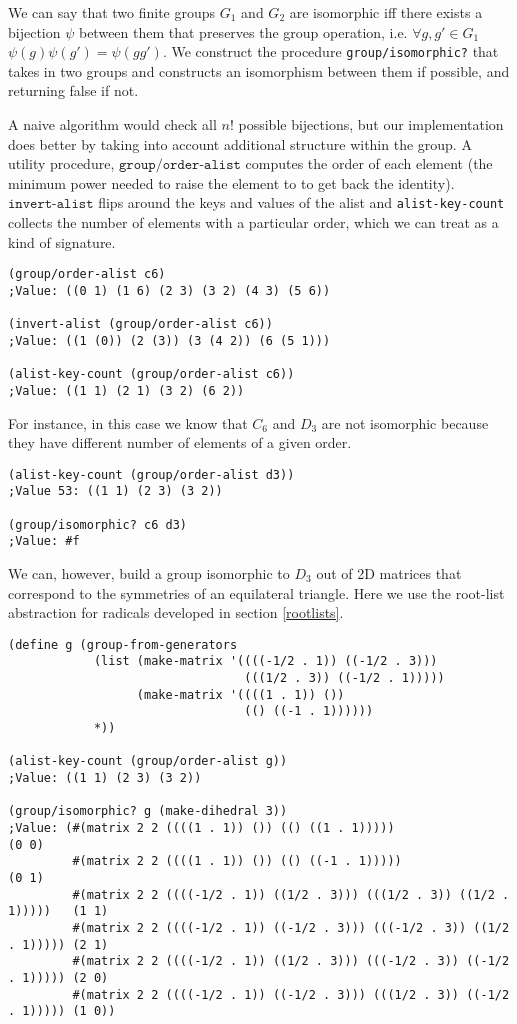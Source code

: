 \documentclass{article}
\begin{document}
            We can say that two finite groups $G_1$ and $G_2$ are isomorphic iff there exists a bijection $\psi$ between them that preserves the group operation, i.e. $\forall g, g' \in G_1$ $\psi(g)\psi(g') = \psi(gg')$. We construct the procedure \texttt{group/isomorphic?} that takes in two groups and constructs an isomorphism between them if possible, and returning false if not.
            
            A naive algorithm would check all $n!$ possible bijections, but our implementation does better by taking into account additional structure within the group. A utility procedure, $\texttt{group/order-alist}$ computes the order of each element (the minimum power needed to raise the element to to get back the identity). $\texttt{invert-alist}$ flips around the keys and values of the alist and \texttt{alist-key-count} collects the number of elements with a particular order, which we can treat as a kind of signature.
		
\begin{verbatim}
(group/order-alist c6)
;Value: ((0 1) (1 6) (2 3) (3 2) (4 3) (5 6))

(invert-alist (group/order-alist c6))
;Value: ((1 (0)) (2 (3)) (3 (4 2)) (6 (5 1)))

(alist-key-count (group/order-alist c6))
;Value: ((1 1) (2 1) (3 2) (6 2))
\end{verbatim}
		
            For instance, in this case we know that $C_{6}$ and $D_3$ are not isomorphic because they have different number of elements of a given order.

\begin{verbatim}
(alist-key-count (group/order-alist d3))
;Value 53: ((1 1) (2 3) (3 2))

(group/isomorphic? c6 d3)
;Value: #f
\end{verbatim}

            We can, however, build a group isomorphic to $D_3$ out of 2D matrices that correspond to the symmetries of an equilateral triangle. Here we use the root-list abstraction for radicals developed in section \ref{rootlists}.
		
\begin{verbatim}
(define g (group-from-generators
     	    (list (make-matrix '((((-1/2 . 1)) ((-1/2 . 3)))
				                 (((1/2 . 3)) ((-1/2 . 1)))))
		          (make-matrix '((((1 . 1)) ())
				                 (() ((-1 . 1))))))
	        *))

(alist-key-count (group/order-alist g))
;Value: ((1 1) (2 3) (3 2))

(group/isomorphic? g (make-dihedral 3))
;Value: (#(matrix 2 2 ((((1 . 1)) ()) (() ((1 . 1)))))                          (0 0) 
         #(matrix 2 2 ((((1 . 1)) ()) (() ((-1 . 1)))))                         (0 1) 
         #(matrix 2 2 ((((-1/2 . 1)) ((1/2 . 3))) (((1/2 . 3)) ((1/2 . 1)))))   (1 1)
         #(matrix 2 2 ((((-1/2 . 1)) ((-1/2 . 3))) (((-1/2 . 3)) ((1/2 . 1))))) (2 1) 
         #(matrix 2 2 ((((-1/2 . 1)) ((1/2 . 3))) (((-1/2 . 3)) ((-1/2 . 1))))) (2 0) 
         #(matrix 2 2 ((((-1/2 . 1)) ((-1/2 . 3))) (((1/2 . 3)) ((-1/2 . 1))))) (1 0))
\end{verbatim}
		
\end{document}
